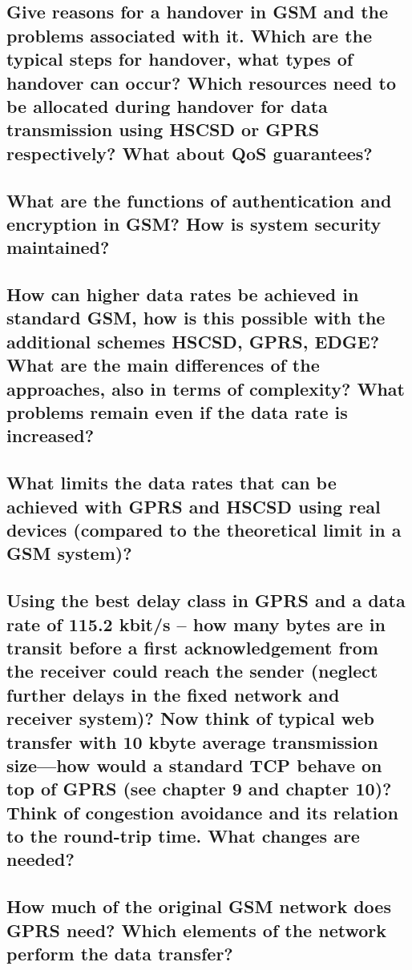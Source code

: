 \subsection{Give reasons for a handover in GSM and the problems associated with it. Which are the typical steps for handover, what types of handover can occur? Which resources need to be allocated during handover for data transmission using HSCSD or GPRS respectively? What about QoS guarantees?}

\subsection{What are the functions of authentication and encryption in GSM? How is system security maintained?}

\subsection{How can higher data rates be achieved in standard GSM, how is this possible with the additional schemes HSCSD, GPRS, EDGE? What are the main differences of the approaches, also in terms of complexity? What problems remain even if the data rate is increased?}

\subsection{What limits the data rates that can be achieved with GPRS and HSCSD using real devices (compared to the theoretical limit in a GSM system)?}

\subsection{Using the best delay class in GPRS and a data rate of 115.2 kbit/s – how many bytes are in transit before a first acknowledgement from the receiver could reach the sender (neglect further delays in the fixed network and receiver system)? Now think of typical web transfer with 10 kbyte average transmission size—how would a standard TCP behave on top of GPRS (see chapter 9 and chapter 10)? Think of congestion avoidance and its relation to the round-trip time. What changes are needed?}

\subsection{How much of the original GSM network does GPRS need? Which elements of the network perform the data transfer?}


